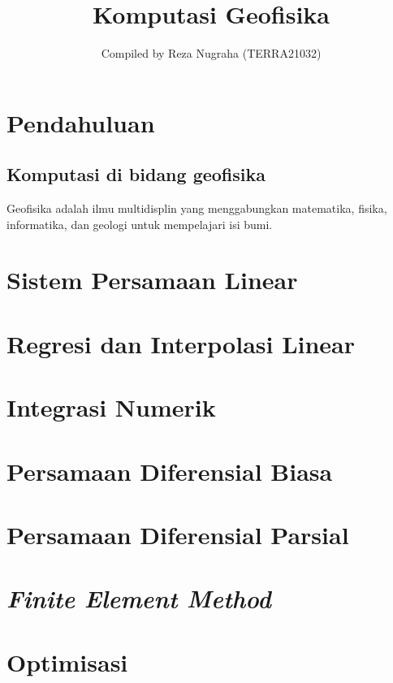 \documentclass[11pt,a4paper]{book}
\title{Komputasi Geofisika}
\author{Compiled by Reza Nugraha (TERRA21032)}
\begin{document}
	\maketitle 
	\tableofcontents
	\chapter{Pendahuluan}
	\section{Komputasi di bidang geofisika}
	Geofisika adalah ilmu multidisplin yang menggabungkan matematika, fisika, informatika, dan geologi untuk mempelajari isi bumi.
	
	\chapter{Sistem Persamaan Linear}
	\chapter{Regresi dan Interpolasi Linear}
	\chapter{Integrasi Numerik}
	\chapter{Persamaan Diferensial Biasa}
	\chapter{Persamaan Diferensial Parsial}
	\chapter{\textit{Finite Element Method}}
	\chapter{Optimisasi}
\end{document}
